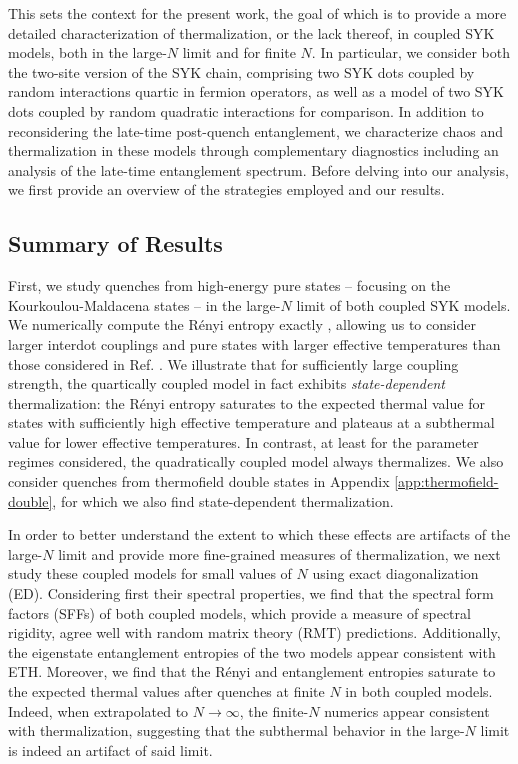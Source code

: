 \documentclass[reprint, floatfix,eqsecnum,superscriptaddress,preprint,nofootinbib,onecolumn,amsmath,amssymb,aps,prb]{revtex4-2}
\begin{document}
This sets the context for the present work, the goal of which is to provide a more detailed characterization of thermalization, or the lack thereof, in coupled SYK models, both in the large-$N$ limit and for finite $N$. In particular, we consider both the two-site version of the SYK chain, comprising two SYK dots coupled by random interactions quartic in fermion operators, as well as a model of two SYK dots coupled by random quadratic interactions for comparison. In addition to reconsidering the late-time post-quench entanglement, we characterize chaos and thermalization in these models through complementary diagnostics including an analysis of the late-time entanglement spectrum. Before delving into our analysis, we first provide an overview of the strategies employed and our results.

\subsection{Summary of Results}
First, we study quenches from high-energy pure states -- %
focusing on the Kourkoulou-Maldacena states \cite{Kourkoulou2017} -- in the large-$N$ limit of both coupled SYK models. 
We numerically compute the R\'enyi entropy  exactly%
, allowing us to consider larger interdot couplings and pure states with larger effective temperatures than those considered in Ref. \cite{Gu2017b}.
We illustrate that for sufficiently large coupling strength, the quartically coupled model in fact exhibits \emph{state-dependent} thermalization: the R\'enyi entropy saturates to the expected thermal value for states with sufficiently high effective temperature and plateaus at a subthermal value for lower effective temperatures. 
In contrast, at least for the parameter regimes considered, the quadratically coupled model always thermalizes. 
We also consider quenches from thermofield double states in Appendix \ref{app:thermofield-double}, for which we also find state-dependent thermalization.


In order to better understand the extent to which these effects are artifacts of the large-$N$ limit and provide more fine-grained measures of thermalization, we next study these coupled models for small values of $N$ using exact diagonalization (ED). Considering first their spectral properties, we find that the spectral form factors (SFFs) of both coupled models, which provide a measure of spectral rigidity, agree well with random matrix theory (RMT) predictions. Additionally, the eigenstate entanglement entropies of the two models appear consistent with ETH.
Moreover, we find that the R\'enyi and entanglement entropies saturate to the expected thermal values after quenches at finite $N$ in both coupled models. %
Indeed, when extrapolated to $N \to \infty$, the finite-$N$ numerics appear consistent with thermalization, suggesting that the subthermal behavior in the large-$N$ limit is indeed an artifact of said limit.
\end{document}
